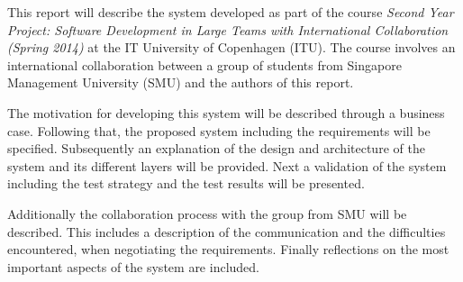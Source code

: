 \documentclass[../report.tex]{subfiles}
\begin{document}
This report will describe the system developed as part of the course \textit{Second Year Project: Software Development in Large Teams with International Collaboration (Spring 2014)} at the IT University of Copenhagen (ITU). The course involves an international collaboration between a group of students from Singapore Management University (SMU) and the authors of this report.

The motivation for developing this system will be described through a business case. Following that, the proposed system including the requirements will be specified. Subsequently an explanation of the design and architecture of the system and its different layers will be provided. Next a validation of the system including the test strategy and the test results will be presented. 

Additionally the collaboration process with the group from SMU will be described. This includes a description of the communication and the difficulties encountered, when negotiating the requirements. Finally reflections on the most important aspects of the system are included.




\end{document}
